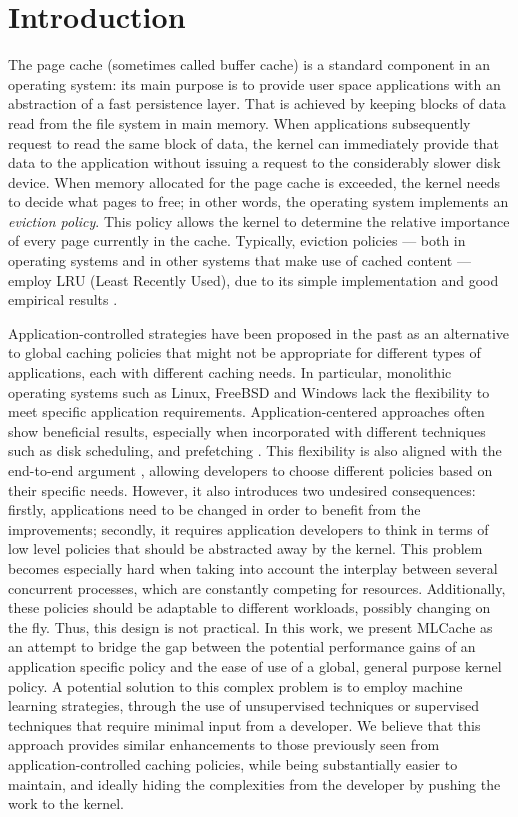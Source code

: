 \section{Introduction}

The page cache (sometimes called buffer cache) is a standard component in an
operating system: its main purpose is to provide user space applications with
an abstraction of a fast persistence layer. That is achieved by keeping blocks
of data read from the file system in main memory. When applications
subsequently request to read the same block of data, the kernel can immediately
provide that data to the application without issuing a request to the
considerably slower disk device. When memory allocated for the page cache is
exceeded, the kernel needs to decide what pages to free; in other words, the
operating system implements an \emph{eviction policy}.  This policy allows the
kernel to determine the relative importance of every page currently in the
cache. Typically, eviction policies --- both in operating systems and in other
systems that make use of cached content --- employ LRU (Least Recently Used),
due to its simple implementation and good empirical results
\cite{Denning:1968}.

Application-controlled strategies have been proposed in the past as an
alternative to global caching policies that might not be appropriate for
different types of applications, each with different caching needs. In
particular, monolithic operating systems such as Linux, FreeBSD and Windows
lack the flexibility to meet specific application requirements.
Application-centered approaches often show beneficial results, especially when
incorporated with different techniques such as disk scheduling, and prefetching
\cite{Cao:1996}. This flexibility is also aligned with the end-to-end argument
\cite{Saltzer:1984}, allowing developers to choose different policies based on
their specific needs. However, it also introduces two undesired consequences:
firstly, applications need to be changed in order to benefit from the
improvements; secondly, it requires application developers to think in terms of
low level policies that should be abstracted away by the kernel.  This problem
becomes especially hard when taking into account the interplay between several
concurrent processes, which are constantly competing for resources.
Additionally, these policies should be adaptable to different workloads,
possibly changing on the fly. Thus, this design is not practical. In this work,
we present MLCache as an attempt to bridge the gap between the potential
performance gains of an application specific policy and the ease of use of a
global, general purpose kernel policy. A potential solution to this complex
problem is to employ machine learning strategies, through the use of
unsupervised techniques or supervised techniques that require minimal input
from a developer. We believe that this approach provides similar enhancements
to those previously seen from application-controlled caching policies, while
being substantially easier to maintain, and ideally hiding the complexities
from the developer by pushing the work to the kernel.
